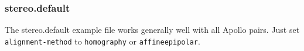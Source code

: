 \subsubsection*{stereo.default}

The stereo.default example file works generally well with all Apollo
pairs. Just set \texttt{alignment-method} to \texttt{homography} or
\texttt{affineepipolar}.








